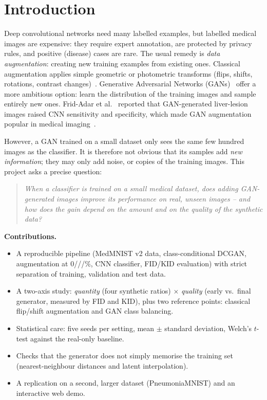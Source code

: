 \section{Introduction}
Deep convolutional networks need many labelled examples, but labelled medical images are expensive: they require
expert annotation, are protected by privacy rules, and positive (disease) cases are rare. The usual remedy is
\emph{data augmentation}: creating new training examples from existing ones. Classical augmentation applies simple
geometric or photometric transforms (flips, shifts, rotations, contrast changes)~\cite{shorten2019survey}. Generative
Adversarial Networks (GANs)~\cite{goodfellow2014gan} offer a more ambitious option: learn the distribution of the
training images and sample entirely new ones. Frid-Adar et al.~\cite{fridadar2018gan} reported that GAN-generated
liver-lesion images raised CNN sensitivity and specificity, which made GAN augmentation popular in medical
imaging~\cite{yi2019ganmedical}.

However, a GAN trained on a small dataset only sees the same few hundred images as the classifier. It is therefore not
obvious that its samples add \emph{new information}; they may only add noise, or copies of the training images.
This project asks a precise question:

\begin{quote}
\emph{When a classifier is trained on a small medical dataset, does adding GAN-generated images improve its performance
on real, unseen images -- and how does the gain depend on the amount and on the quality of the synthetic data?}
\end{quote}

\noindent\textbf{Contributions.}
\begin{itemize}
  \item A reproducible pipeline (MedMNIST v2 data, class-conditional DCGAN, augmentation at 0///\%, CNN
        classifier, FID/KID evaluation) with strict separation of training, validation and test data.
  \item A two-axis study: \emph{quantity} (four synthetic ratios) $\times$ \emph{quality} (early vs.\ final generator,
        measured by FID and KID), plus two reference points: classical flip/shift augmentation and GAN class balancing.
  \item Statistical care: five seeds per setting, mean $\pm$ standard deviation, Welch's $t$-test against the real-only baseline.
  \item Checks that the generator does not simply memorise the training set (nearest-neighbour distances and latent
        interpolation).
  \item A replication on a second, larger dataset (PneumoniaMNIST) and an interactive web demo.
\end{itemize}

